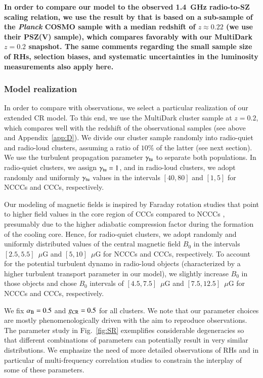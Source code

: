 \documentclass[useAMS,usenatbib]{mn2e}
\begin{document}
{\bf In order to compare our model to the observed 1.4~GHz radio-to-SZ scaling
relation, we use the result by \cite{2013arXiv1307.3049S} that is based 
on a sub-sample of the \emph{Planck} COSMO sample \citep{2013arXiv1303.5080P} with 
a median redshift of $z \approx 0.22$ (we use their PSZ(V) sample), which compares favorably 
with our MultiDark $z = 0.2$ snapshot. The same comments regarding the small sample size of RHs, 
selection biases, and systematic uncertainties in the luminosity measurements also apply here.}


\subsubsection{Model realization}

In order to compare with observations, we select a
particular realization of our extended CR model. To this end, we use the MultiDark cluster
sample at $z=0.2$, which compares well with the redshift of the observational
samples (see above and Appendix~\ref{app:D}). We divide our cluster sample
randomly into radio-quiet and radio-loud clusters, assuming a ratio of $10\%$ of
the latter (see next section). We use the turbulent propagation parameter $\gamma_{{\mathrm{tu}}}$ to
separate both populations. In radio-quiet clusters, we assign
$\gamma_{{\mathrm{tu}}}=1$, and in radio-loud clusters, we adopt randomly and
uniformly $\gamma_{{\mathrm{tu}}}$ values in the intervals $[40,80]$ and $[1,5]$ for
NCCCs and CCCs, respectively.

Our modeling of magnetic fields is inspired by Faraday rotation studies that
point to higher field values in the core region of CCCs compared to NCCCs
\citep{2010A&A...513A..30B,2011A&A...529A..13K}, presumably due to the higher
adiabatic compression factor during the formation of the cooling core. Hence,
for radio-quiet clusters, we adopt randomly and uniformly distributed values of
the central magnetic field $B_0$ in the intervals $[2.5,5.5]$~$\mu$G and
$[5,10]$~$\mu$G for NCCCs and CCCs, respectively. To account for the potential
turbulent dynamo in radio-loud objects (characterized by a higher turbulent
transport parameter in our model), we slightly increase $B_0$ in those objects
and chose $B_0$ intervals of $[4.5,7.5]$~$\mu$G and $[7.5,12.5]$~$\mu$G for
NCCCs and CCCs, respectively.

We fix $\alpha_{{\mathrm{B}}}=0.5$ and $g_{{\mathrm{CR}}}=0.5$ for all clusters. We note
that our parameter choices are mostly phenomenologically driven with the aim to
reproduce observations. The parameter study in Fig.~\ref{fig:SR} exemplifies
considerable degeneracies so that different combinations of parameters can
potentially result in very similar distributions. We emphasize the need of more
detailed observations of RHs and in particular of multi-frequency
correlation studies to constrain the interplay of some of these parameters.
\end{document}
